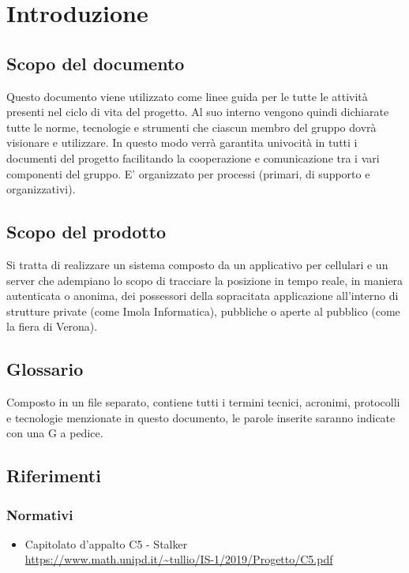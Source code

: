 \section{Introduzione}
\subsection{Scopo del documento}
	Questo documento viene utilizzato come linee guida per le tutte le attività presenti nel ciclo di vita del progetto.
	Al suo interno vengono quindi dichiarate tutte le norme, tecnologie e strumenti che ciascun membro del gruppo \Gruppo dovrà visionare e utilizzare.
	In questo modo verrà garantita univocità in tutti i documenti del progetto facilitando la cooperazione e comunicazione tra i vari componenti del gruppo.
	E' organizzato per processi (primari, di supporto e organizzativi).
	
\subsection{Scopo del prodotto}
	Si tratta di realizzare un sistema composto da un applicativo per cellulari e un server che adempiano lo scopo di tracciare la posizione in tempo reale, in maniera autenticata o anonima, dei possessori della sopracitata applicazione all’interno di strutture private (come Imola Informatica),  pubbliche o aperte al pubblico (come la fiera di Verona).
	 
\subsection{Glossario}
	Composto in un file separato, contiene tutti i termini tecnici, acronimi, protocolli e tecnologie menzionate in questo documento, le parole inserite saranno indicate con una G a pedice.
	
\subsection{Riferimenti} 
\subsubsection{Normativi}
\begin{itemize}
	\item Capitolato d'appalto C5 - Stalker 
	\\ \url{https://www.math.unipd.it/~tullio/IS-1/2019/Progetto/C5.pdf}
\end{itemize}

